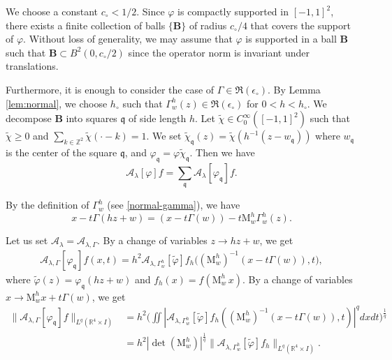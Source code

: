 \documentclass[10pt] %
{amsart}
\theoremstyle{plain}
\numberwithin{equation}{section}
\newcommand{\fq}{\mathfrak q}
\begin{document}
We choose a constant $c_\circ<1/2 $. 
Since $\varphi$ is compactly supported in $[-1,1]^2$, there exists a finite collection of balls $\{\mathbf B\}$  of radius $c_\circ/4$ that covers the support of $\varphi$.
Without loss of generality, we may assume that $\varphi$ is supported in a ball $\mathbf B$ such that $\mathbf B \subset B^2(0, c_\circ/2)$ since the operator norm is invariant under translations. 



Furthermore, it is enough to consider the case of $\Gamma \in \mathfrak R(\epsilon_\circ)$.
By Lemma \ref{lem:normal}, we choose $h_\circ $ such that $\Gamma_w^h(z) \in \mathfrak R(\epsilon_\circ)$ for $0<   h  <   h_\circ$.
We decompose $\mathbf B$ into squares $\fq$ of side length $ h $.
Let $\widetilde \chi\in C_0^\infty([-1,1]^2)$ such that $\widetilde \chi \ge0$ and $\sum_{k \in \mathbb Z^2} \widetilde \chi(\cdot-k)=1$. 
We set $\widetilde \chi_{\fq} (z)=\widetilde \chi(h^{-1}( z - w_{ \fq}))$ where $ w_{ \mathfrak  q}$ is the center of the square $  \mathfrak q$, and $\varphi_{\mathfrak q}=\varphi \widetilde \chi_{\fq}$. 
Then we have
\begin{equation}\label{decomp1}
\mathcal A_\lambda[\varphi] f=\sum_{\fq} \mathcal A_\lambda[\varphi_{ \mathfrak  q}]f.
\end{equation}

 
By the definition of $\Gamma_{w}^h$ (see \eqref{normal-gamma}), we have
\[
x - t \Gamma(hz+w) = (x-t \Gamma(w)) - t\mathrm M_w^h\Gamma_{w}^h(z).
\]

Let us set $\mathcal A_\lambda = \mathcal A_{\lambda,\Gamma}$. 
By a change of variables $z\rightarrow hz+ w$, 
we get
\begin{align*} 
\mathcal A_{\lambda,\Gamma}[\varphi_\fq] f(x,t)  = h^2 \mathcal A_{\lambda,\Gamma_{w}^h} [\widetilde\varphi] f_h \big( (\mathrm M_w^h)^{-1}(x-t\Gamma(w)),t \big),
\end{align*}
where $\widetilde\varphi (z)  =  \varphi_{\mathfrak q} ( hz+w)$ and $f_h(x)=f(\mathrm M_w^h\,x)$.
By a change of variables  $x \to  \mathrm M_w^h x + t \Gamma(w)$, we get
\begin{align}
  \| \mathcal A_{\lambda,\Gamma} [\varphi_\fq] f \|_{L^q(\mathbb R^4\times I)}    
 & = h^2 \Big( \iint  |\mathcal A_{\lambda,\Gamma_{w}^h} [\widetilde\varphi ] f_h ((\mathrm M_w^h)^{-1}(x-t\Gamma(w)),t )|^q dx dt \Big)^{\frac1q} \nonumber \\
 & = h^2 |\det (\mathrm M_w^h)|^{\frac 1q}  \| \mathcal A_{\lambda,\Gamma_{w}^h} [\widetilde\varphi ] f_h \|_{L^q(\mathbb R^4\times I)} . \label{rescaled af}
\end{align}
\end{document}
